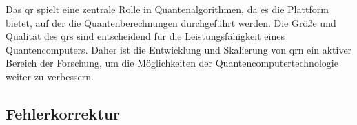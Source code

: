 Das \ac{qr} spielt eine zentrale Rolle in Quantenalgorithmen, da es die Plattform bietet, auf der die Quantenberechnungen durchgeführt werden. Die Größe und Qualität des \ac{qr}s sind entscheidend für die Leistungsfähigkeit eines Quantencomputers. Daher ist die Entwicklung und Skalierung von \ac{qr}n ein aktiver Bereich der Forschung, um die Möglichkeiten der Quantencomputertechnologie weiter zu verbessern.


\subsection{Fehlerkorrektur}